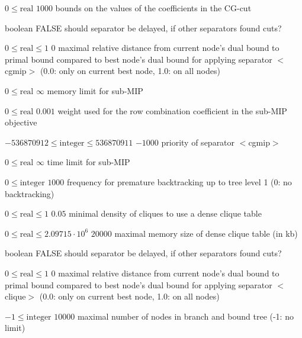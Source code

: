 %
{$0\leq\textrm{real}$}%
{$1000$}%
{bounds on the values of the coefficients in the CG-cut}%
{}

%
{boolean}%
{FALSE}%
{should separator be delayed, if other separators found cuts?}%
{}

%
{$0\leq\textrm{real}\leq1$}%
{$0$}%
{maximal relative distance from current node's dual bound to primal bound compared to best node's dual bound for applying separator $<$cgmip$>$ (0.0: only on current best node, 1.0: on all nodes)}%
{}

%
{$0\leq\textrm{real}$}%
{$\infty$}%
{memory limit for sub-MIP}%
{}

%
{$0\leq\textrm{real}$}%
{$0.001$}%
{weight used for the row combination coefficient in the sub-MIP objective}%
{}

%
{$-536870912\leq\textrm{integer}\leq536870911$}%
{$-1000$}%
{priority of separator $<$cgmip$>$}%
{}

%
{$0\leq\textrm{real}$}%
{$\infty$}%
{time limit for sub-MIP}%
{}

%
{$0\leq\textrm{integer}$}%
{$1000$}%
{frequency for premature backtracking up to tree level 1 (0: no backtracking)}%
{}

%
{$0\leq\textrm{real}\leq1$}%
{$0.05$}%
{minimal density of cliques to use a dense clique table}%
{}

%
{$0\leq\textrm{real}\leq2.09715 \cdot 10^{  6}$}%
{$20000$}%
{maximal memory size of dense clique table (in kb)}%
{}

%
{boolean}%
{FALSE}%
{should separator be delayed, if other separators found cuts?}%
{}

%
{$0\leq\textrm{real}\leq1$}%
{$0$}%
{maximal relative distance from current node's dual bound to primal bound compared to best node's dual bound for applying separator $<$clique$>$ (0.0: only on current best node, 1.0: on all nodes)}%
{}

%
{$-1\leq\textrm{integer}$}%
{$10000$}%
{maximal number of nodes in branch and bound tree (-1: no limit)}%
{}

